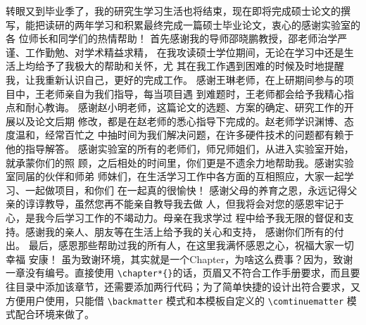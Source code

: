 \begin{thanksfor}
	
转眼又到毕业季了，我的研究生学习生活也将结束，现在即将完成硕士论文的撰 写，能把读研的两年学习和积累最终完成一篇硕士毕业论文，衷心的感谢实验室的各 位师长和同学们的热情帮助！ 首先感谢我的导师邵晓鹏教授，邵老师治学严谨、工作勤勉、对学术精益求精， 在我攻读硕士学位期间，无论在学习中还是生活上均给予了我极大的帮助和关怀，尤 其在我工作遇到困难的时候及时地提醒我，让我重新认识自己，更好的完成工作。 感谢王琳老师，在上研期间参与的项目中，王老师亲自为我们指导，每当项目遇 到难题时，王老师都会给予我精心指点和耐心教诲。 感谢赵小明老师，这篇论文的选题、方案的确定、研究工作的开展以及论文后期 修改，都是在赵老师的悉心指导下完成的。赵老师学识渊博、态度温和，经常百忙之 中抽时间为我们解决问题，在许多硬件技术的问题都有赖于他的指导解答。 感谢实验室的所有的老师们，师兄师姐们，从进入实验室开始，就承蒙你们的照 顾，之后相处的时间里，你们更是不遗余力地帮助我。感谢实验室同届的伙伴和师弟 师妹们，在生活学习工作中各方面的互相照应，大家一起学习、一起做项目，和你们 在一起真的很愉快！ 感谢父母的养育之恩，永远记得父亲的谆谆教导，虽然您再不能亲自教导我去做 人，但我将会对您的感恩牢记于心，是我今后学习工作的不竭动力。母亲在我求学过 程中给予我无限的督促和支持。感谢我的亲人、朋友等在生活上给予我的关心和支持， 感谢你们所有的付出。 最后，感恩那些帮助过我的所有人，在这里我满怀感恩之心，祝福大家一切幸福 安康！
虽为致谢环境，其实就是一个Chapter，为啥这么费事？因为，致谢一章没有编号。直接使用 \verb=\chapter*{}=的话，页眉又不符合工作手册要求，而且要往目录中添加该章节，还需要添加两行代码；为了简单快捷的设计出符合要求，又方便用户使用，只能借 \verb=\backmatter= 模式和本模板自定义的 \verb=\comtinuematter= 模式配合环境来做了。
\end{thanksfor}